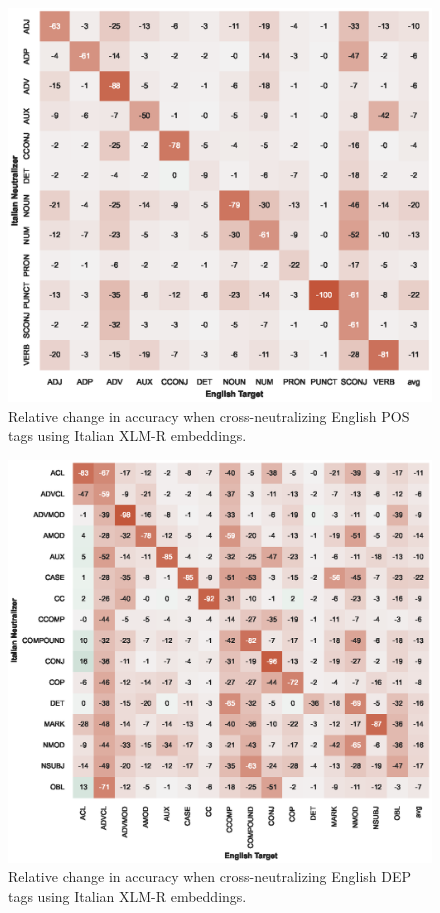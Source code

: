 \documentclass[11pt,a4paper]{article}
\begin{document}
\begin{figure}[t]
    \centering
    \includegraphics{full_figures/POS-crosslingual-en_gum_from_it_vit-accdrop.eps}
    \caption{Relative change in accuracy when cross-neutralizing English POS tags using Italian XLM-R embeddings.}
    \label{fig:xlingual_xneutr_pos_en_gum_from_it_vit}
\end{figure}

\begin{figure}[t]
    \centering
    \includegraphics{full_figures/DEP-crosslingual-en_gum_from_it_vit-accdrop.eps}
    \caption{Relative change in accuracy when cross-neutralizing English DEP tags using Italian XLM-R embeddings.}
    \label{fig:xlingual_xneutr_dep_en_gum_from_it_vit}
\end{figure}
\end{document}
